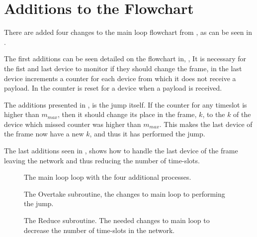 \section{Additions to the Flowchart}
There are added four changes to the main loop flowchart from , as can be seen in .

The first additions can be seen detailed on the flowchart in, ,
It is necessary for the fist and last device to monitor if they should change the frame, in  the last device increments a counter for each device from which it does not receive a payload.
In  the counter is reset for a device when a payload is received.

The additions presented in , is the jump itself.
If the counter for any timeslot is higher than $m_{max}$, then it should change its place in the frame, $k$, to the $k$ of the device which missed counter was higher than $m_{max}$.
This makes the last device of the frame now have a new $k$, and thus it has performed the jump.	

The last additions seen in , shows how to handle the last device of the frame leaving the network and thus reducing the number of time-slots.
                                                                         
\begin{figure}[!p] 
\vspace{-15pt} 
\centering
\footnotesize

\caption{The main loop loop with the four additional processes.}
\label{fig:mainFrameDefrag}   
\end{figure}  

  

\begin{figure}[!p]
\centering
\footnotesize

\caption{The Overtake subroutine, the changes to main loop to performing the jump.}
\label{fig:jd2}    
\end{figure}

\begin{figure}[!p]
\centering
\footnotesize

\caption{The Reduce subroutine. The needed changes to main loop to decrease the number of time-slots in the network.}
\label{fig:jd3}    
\end{figure}   
